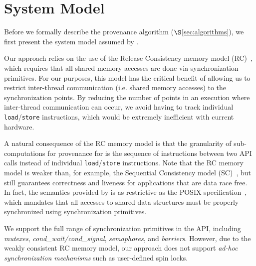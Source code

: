 \section{System Model}
\label{sec:model}

Before we formally describe the provenance algorithm ($\S$\ref{sec:algorithms}),  we first present the system model assumed by \projecttitle.%

 Our approach relies on the use of the
Release Consistency memory model (RC)~\cite{DSM-RC}, which requires that all shared memory accesses are done via synchronization primitives.
For our purposes, this model has the critical
benefit of allowing us to restrict inter-thread communication (i.e. shared
memory accesses) to the synchronization points. By reducing the number of 
points in an execution where inter-thread communication can occur, we avoid
having to track individual {\tt load}/{\tt store} instructions, %
which would be extremely inefficient with current hardware. 

A natural consequence of the RC memory model is that the granularity of sub-computations for provenance for \projecttitle is the sequence of instructions between two \pthreads API calls instead of  individual {\tt load}/{\tt store} instructions. Note that the RC memory model is weaker
than, for example, the Sequential Consistency model (SC)~\cite{scLamport}, but
still guarantees correctness and liveness for applications that are data race
free. In fact,  the semantics provided by
\projecttitle is as restrictive as the POSIX specification~\cite{pthreads-spec}, which mandates that all accesses to shared data structures must be properly synchronized using 
\pthreads synchronization primitives. 

 We support the full range of synchronization
primitives in the \pthreads API, including {\em mutexes}, {\em cond\_wait/cond\_signal}, {\em semaphores},  and {\em
barriers}. However, due to the weakly consistent RC memory model, our approach
does not support {\em ad-hoc synchronization mechanisms} such as user-defined spin locks. 
%

